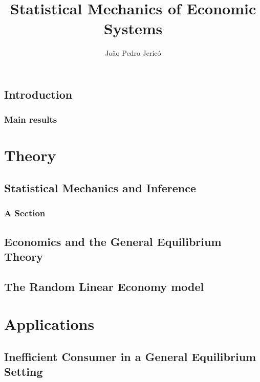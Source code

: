 \documentclass[
  oneside,
  11pt, a4paper,
  footinclude=true,
  headinclude=true,
  cleardoublepage=empty,
]{scrbook}
\title{Statistical Mechanics of Economic Systems}
\author{João Pedro Jericó}
\begin{document}
\maketitle








\chapter{Introduction}


\section{Main results}


\part{Theory}


\chapter{Statistical Mechanics and Inference}

\section{A Section}

\chapter{Economics and the General Equilibrium Theory}



\chapter{The Random Linear Economy model}



\part{Applications}

\chapter{Inefficient Consumer in a General Equilibrium Setting}
\end{document}
